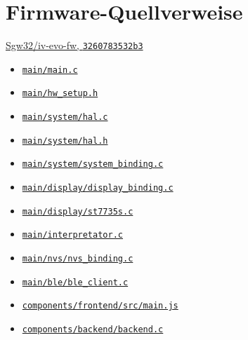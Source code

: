 \section{Firmware-Quellverweise}
\href{https://github.com/Sgw32/iv-evo-fw/tree/3260783532b3d4ad8529b23f4e907c0a6ab03262}{Sgw32/iv-evo-fw, \texttt{3260783532b3}}
\begin{itemize}
\item \href{https://github.com/Sgw32/iv-evo-fw/blob/3260783532b3d4ad8529b23f4e907c0a6ab03262/main/main.c}{\nolinkurl{main/main.c}}
\item \href{https://github.com/Sgw32/iv-evo-fw/blob/3260783532b3d4ad8529b23f4e907c0a6ab03262/main/hw_setup.h}{\nolinkurl{main/hw_setup.h}}
\item \href{https://github.com/Sgw32/iv-evo-fw/blob/3260783532b3d4ad8529b23f4e907c0a6ab03262/main/system/hal.c}{\nolinkurl{main/system/hal.c}}
\item \href{https://github.com/Sgw32/iv-evo-fw/blob/3260783532b3d4ad8529b23f4e907c0a6ab03262/main/system/hal.h}{\nolinkurl{main/system/hal.h}}
\item \href{https://github.com/Sgw32/iv-evo-fw/blob/3260783532b3d4ad8529b23f4e907c0a6ab03262/main/system/system_binding.c}{\nolinkurl{main/system/system_binding.c}}
\item \href{https://github.com/Sgw32/iv-evo-fw/blob/3260783532b3d4ad8529b23f4e907c0a6ab03262/main/display/display_binding.c}{\nolinkurl{main/display/display_binding.c}}
\item \href{https://github.com/Sgw32/iv-evo-fw/blob/3260783532b3d4ad8529b23f4e907c0a6ab03262/main/display/st7735s.c}{\nolinkurl{main/display/st7735s.c}}
\item \href{https://github.com/Sgw32/iv-evo-fw/blob/3260783532b3d4ad8529b23f4e907c0a6ab03262/main/interpretator.c}{\nolinkurl{main/interpretator.c}}
\item \href{https://github.com/Sgw32/iv-evo-fw/blob/3260783532b3d4ad8529b23f4e907c0a6ab03262/main/nvs/nvs_binding.c}{\nolinkurl{main/nvs/nvs_binding.c}}
\item \href{https://github.com/Sgw32/iv-evo-fw/blob/3260783532b3d4ad8529b23f4e907c0a6ab03262/main/ble/ble_client.c}{\nolinkurl{main/ble/ble_client.c}}
\item \href{https://github.com/Sgw32/iv-evo-fw/blob/3260783532b3d4ad8529b23f4e907c0a6ab03262/components/frontend/src/main.js}{\nolinkurl{components/frontend/src/main.js}}
\item \href{https://github.com/Sgw32/iv-evo-fw/blob/3260783532b3d4ad8529b23f4e907c0a6ab03262/components/backend/backend.c}{\nolinkurl{components/backend/backend.c}}

\end{itemize}

